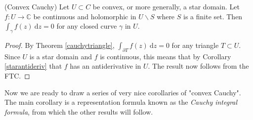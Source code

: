 \documentclass[a4paper]{scrartcl}
\begin{document}
\begin{corollary}(Convex Cauchy)
      Let $U \subset C$ be convex, or more generally, a star domain. Let $f: U \rightarrow \mathbb{C}$ be continuous and holomorphic in $U \backslash S$ where $S$ is a finite set. Then $\int_{\gamma}^{}f (z) \ \mathrm{d}z=0 $ for any closed curve $\gamma$ in $U$.
\end{corollary}
\begin{proof}
      By Theorem \ref{cauchytriangle}, $\int_{ \partial T}^{} f (z)\ \mathrm{d}z=0 $ for any triangle $T \subset U$. Since $U$ is a star domain and $f$ is continuous, this means that by Corollary \ref{starantideriv} that $f$ has an antiderivative in $U$. The result now follows from the FTC.
\end{proof}
Now we are ready to draw a series of very nice corollaries of "convex Cauchy". The main corollary is a representation formula known as the \emph{Cauchy integral formula}, from which the other results will follow.
\end{document}
